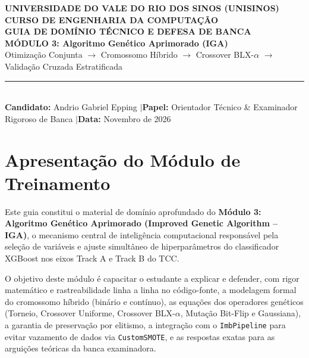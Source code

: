 \documentclass[11pt,a4paper]{article}
\begin{document}
\begin{center}
  {\large\textbf{\textsf{UNIVERSIDADE DO VALE DO RIO DOS SINOS (UNISINOS)}}}\\[0.2cm]
  {\normalsize\textbf{\textsf{CURSO DE ENGENHARIA DA COMPUTAÇÃO}}}\\[0.4cm]
  {\LARGE\textbf{\textcolor{NavyBlue}{\textsf{GUIA DE DOMÍNIO TÉCNICO E DEFESA DE BANCA}}}}\\[0.2cm]
  {\Large\textbf{\textsf{MÓDULO 3: Algoritmo Genético Aprimorado (IGA)}}}\\[0.2cm]
  {\normalsize\textsf{Otimização Conjunta $\longrightarrow$ Cromossomo Híbrido $\longrightarrow$ Crossover BLX-$\alpha$ $\longrightarrow$ Validação Cruzada Estratificada}}\\[0.4cm]
  \rule{\textwidth}{1pt}\\[0.2cm]
  \small\textbf{Candidato:} Andrio Gabriel Epping \quad$|$\quad \textbf{Papel:} Orientador Técnico \& Examinador Rigoroso de Banca \quad$|$\quad \textbf{Data:} Novembro de 2026
\end{center}
\vspace{0.3cm}

\section*{Apresentação do Módulo de Treinamento}
Este guia constitui o material de domínio aprofundado do \textbf{Módulo 3: Algoritmo Genético Aprimorado (Improved Genetic Algorithm -- IGA)}, o mecanismo central de inteligência computacional responsável pela seleção de variáveis e ajuste simultâneo de hiperparâmetros do classificador XGBoost nos eixos Track A e Track B do TCC.

O objetivo deste módulo é capacitar o estudante a explicar e defender, com rigor matemático e rastreabilidade linha a linha no código-fonte, a modelagem formal do cromossomo híbrido (binário e contínuo), as equações dos operadores genéticos (Torneio, Crossover Uniforme, Crossover BLX-$\alpha$, Mutação Bit-Flip e Gaussiana), a garantia de preservação por elitismo, a integração com o \texttt{ImbPipeline} para evitar vazamento de dados via \texttt{CustomSMOTE}, e as respostas exatas para as arguições teóricas da banca examinadora.
\end{document}
